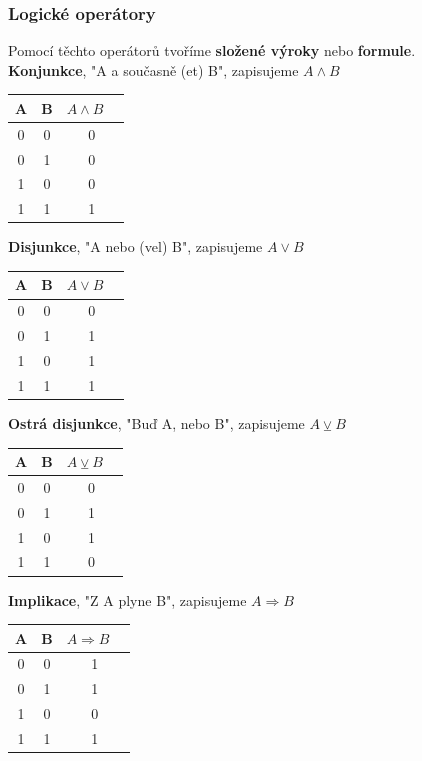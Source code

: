 \documentclass[12pt, a4paper]{article}
\begin{document}
\subsubsection*{Logické operátory}
Pomocí těchto operátorů tvoříme \textbf{složené výroky} nebo \textbf{formule}.\\
\textbf{Konjunkce}, "A a současně (et) B", zapisujeme $A \land B$
\begin{center}
\begin{tabular}{|c | c | c|} 
\hline
A & B & $A \land B$ \ \\
\hline
0 & 0 & 0 \\
\hline
0 & 1 & 0 \\
\hline
1 & 0 & 0 \\
\hline
1 & 1 & 1\\
\hline
\end{tabular}
\end{center}
\textbf{Disjunkce}, "A nebo (vel) B", zapisujeme $A \lor B$
\begin{center}
\begin{tabular}{|c | c | c|} 
\hline
A & B & $A \lor B$ \ \\
\hline
0 & 0 & 0 \\
\hline
0 & 1 & 1 \\
\hline
1 & 0 & 1 \\
\hline
1 & 1 & 1\\
\hline
\end{tabular}
\end{center}
\textbf{Ostrá disjunkce}, "Buď A, nebo B", zapisujeme $ A \veebar B $
\begin{center}
\begin{tabular}{|c | c | c|} 
\hline
A & B & $A \veebar B$ \ \\
\hline
0 & 0 & 0 \\
\hline
0 & 1 & 1 \\
\hline
1 & 0 & 1 \\
\hline
1 & 1 & 0\\
\hline
\end{tabular}
\end{center}
\textbf{Implikace}, "Z A plyne B", zapisujeme $A \Rightarrow B$
\begin{center}
\begin{tabular}{|c | c | c|} 
\hline
A & B & $A \Rightarrow B$ \ \\
\hline
0 & 0 & 1 \\
\hline
0 & 1 & 1 \\
\hline
1 & 0 & 0 \\
\hline
1 & 1 & 1\\
\hline
\end{tabular}
\end{center}
\end{document}
